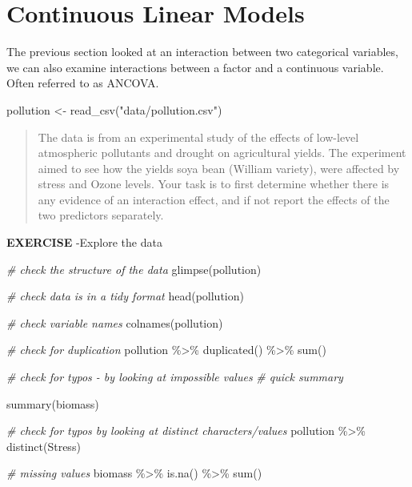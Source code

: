 \documentclass[
]{book}
\newenvironment{Shaded}{\begin{snugshade}}{\end{snugshade}}
\newcommand{\CommentTok}[1]{\textcolor[rgb]{0.56,0.35,0.01}{\textit{#1}}}
\newcommand{\FunctionTok}[1]{\textcolor[rgb]{0.00,0.00,0.00}{#1}}
\newcommand{\NormalTok}[1]{#1}
\newcommand{\OtherTok}[1]{\textcolor[rgb]{0.56,0.35,0.01}{#1}}
\newcommand{\SpecialCharTok}[1]{\textcolor[rgb]{0.00,0.00,0.00}{#1}}
\newcommand{\StringTok}[1]{\textcolor[rgb]{0.31,0.60,0.02}{#1}}
\begin{document}
\hypertarget{continuous-linear-models}{%
\section{Continuous Linear Models}\label{continuous-linear-models}}

The previous section looked at an interaction between two categorical variables, we can also examine interactions between a factor and a continuous variable. Often referred to as ANCOVA.

\begin{Shaded}
\begin{Highlighting}[]
\NormalTok{pollution }\OtherTok{\textless{}{-}} \FunctionTok{read\_csv}\NormalTok{(}\StringTok{"data/pollution.csv"}\NormalTok{)}
\end{Highlighting}
\end{Shaded}

\begin{quote}
The data is from an experimental study of the effects of low-level atmospheric pollutants and drought on agricultural yields. The experiment aimed to see how the yields soya bean (William variety), were affected by stress and Ozone levels. Your task is to first determine whether there is any evidence of an interaction effect, and if not report the effects of the two predictors separately.
\end{quote}

\textbf{EXERCISE} -Explore the data

\begin{Shaded}
\begin{Highlighting}[]
\CommentTok{\# check the structure of the data}
\FunctionTok{glimpse}\NormalTok{(pollution)}

\CommentTok{\# check data is in a tidy format}
\FunctionTok{head}\NormalTok{(pollution)}

\CommentTok{\# check variable names}
\FunctionTok{colnames}\NormalTok{(pollution)}

\CommentTok{\# check for duplication}
\NormalTok{pollution }\SpecialCharTok{\%\textgreater{}\%} 
  \FunctionTok{duplicated}\NormalTok{() }\SpecialCharTok{\%\textgreater{}\%} 
  \FunctionTok{sum}\NormalTok{()}

\CommentTok{\# check for typos {-} by looking at impossible values}
\CommentTok{\# quick summary}

\FunctionTok{summary}\NormalTok{(biomass)}

\CommentTok{\# check for typos by looking at distinct characters/values}
\NormalTok{pollution }\SpecialCharTok{\%\textgreater{}\%} 
  \FunctionTok{distinct}\NormalTok{(Stress)}


\CommentTok{\# missing values}
\NormalTok{biomass }\SpecialCharTok{\%\textgreater{}\%} 
  \FunctionTok{is.na}\NormalTok{() }\SpecialCharTok{\%\textgreater{}\%} 
  \FunctionTok{sum}\NormalTok{()}
\end{Highlighting}
\end{Shaded}
\end{document}
